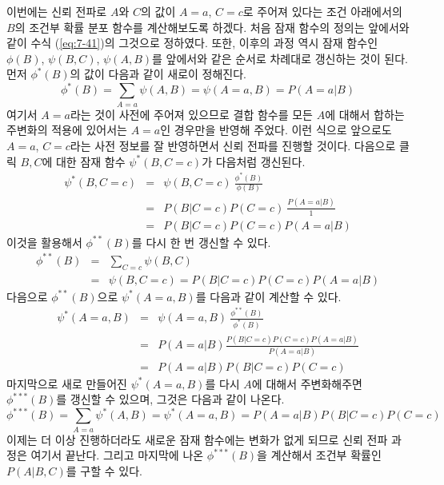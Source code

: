 \documentclass[a4paper]{oblivoir}
\begin{document}
이번에는 신뢰 전파로 $A$와 $C$의 값이 $A=a$, $C=c$로 주어져 있다는 조건 아래에서의 $B$의 조건부 확률 분포 함수를 계산해보도록 하겠다. 처음 잠재 함수의 정의는 앞에서와 같이 수식 (\ref{eq:7-41})의 그것으로 정하였다. 또한, 이후의 과정 역시 잠재 함수인 $\phi(B)$, $\psi(B,C)$, $\psi(A,B)$를 앞에서와 같은 순서로 차례대로 갱신하는 것이 된다. 먼저 $\phi^{*}(B)$의 값이 다음과 같이 새로이 정해진다.  
\begin{equation}
\phi^{*}(B) = \sum_{A=a} \psi(A,B) = \psi(A=a,B) = P(A=a|B)
\label{eq:7-47}
\end{equation} 
여기서 $A=a$라는 것이 사전에 주어져 있으므로 결합 함수를 모든 $A$에 대해서 합하는 주변화의 적용에 있어서는 $A=a$인 경우만을 반영해 주었다. 이런 식으로 앞으로도 $A=a$, $C=c$라는 사전 정보를 잘 반영하면서 신뢰 전파를 진행할 것이다. 다음으로 클릭 $B,C$에 대한 잠재 함수 $\psi^{*}(B,C=c)$가 다음처럼 갱신된다. 
\begin{eqnarray}
\psi^{*}(B,C=c) & = & \psi(B,C=c) \ \frac{\phi^{*}(B)}{\phi(B)} \nonumber \\
& = & P(B|C=c)P(C=c) \ \frac{P(A=a|B)}{1} \nonumber \\
& = & P(B|C=c)P(C=c)P(A=a|B) \label{eq:7-48}
\end{eqnarray}
이것을 활용해서 $\phi^{**}(B)$를 다시 한 번 갱신할 수 있다. 
\begin{eqnarray}
\phi^{**}(B) & = & \sum_{C=c} \psi(B,C)  \nonumber \\
& = & \psi(B,C=c) = P(B|C=c)P(C=c)P(A=a|B)
\label{eq:7-49}
\end{eqnarray} 
다음으로 $\phi^{**}(B)$으로 $\psi^{*}(A=a,B)$를 다음과 같이 계산할 수 있다. 
\begin{eqnarray}
\psi^{*}(A=a,B) & = & \psi(A=a,B) \ \frac{\phi^{**}(B)}{\phi^{*}(B)}  \nonumber \\
& = & P(A=a|B) \frac{P(B|C=c)P(C=c)P(A=a|B)}{P(A=a|B)} \nonumber \\
& = & P(A=a|B)P(B|C=c)P(C=c) \label{eq:7-50}
\end{eqnarray} 
마지막으로 새로 만들어진 $\psi^{*}(A=a,B)$를 다시 $A$에 대해서 주변화해주면 $\phi^{***}(B)$를 갱신할 수 있으며, 그것은 다음과 같이 나온다. 
\begin{equation}
\phi^{***}(B) = \sum_{A=a} \psi^{*}(A,B) = \psi^{*}(A=a,B) = P(A=a|B)P(B|C=c)P(C=c)
\label{eq:7-51}
\end{equation}
이제는 더 이상 진행하더라도 새로운 잠재 함수에는 변화가 없게 되므로 신뢰 전파 과정은 여기서 끝난다. 그리고 마지막에 나온 $\phi^{***}(B)$을 계산해서 조건부 확률인 $P(A|B,C)$를 구할 수 있다. \\
\end{document}
